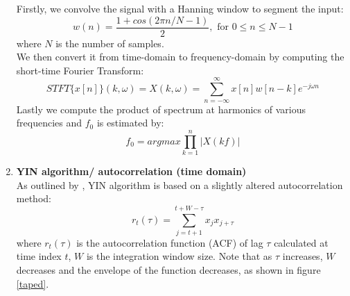 \begin{enumerate}
    Firstly, we convolve the signal with a Hanning window to segment the input:
    \[w(n) = \frac{1+cos(2\pi n/N-1)}{2}, \text{ for } 0 \leq n \leq N-1\] where $N$ is the number of samples.\\
    We then convert it from time-domain to frequency-domain by computing the short-time Fourier Transform:
    \[STFT \{x[n]\}(k,\omega) = X(k,\omega )= \sum _{n=-\infty }^{\infty }x[n]w[n-k]e^{-j\omega n}\]
    Lastly we compute the product of spectrum at harmonics of various frequencies and $f_0$ is estimated by:
    \[f_0 = argmax\prod_{k=1}^{n}|X(kf)|\] 

    \item \textbf{YIN algorithm/ autocorrelation (time domain)}\\
    As outlined by \cite{yin}, YIN algorithm is based on a slightly altered autocorrelation method:
    \[r_t(\tau)=\sum_{j=t+1}^{t+W-\tau}x_j x_{j+\tau}\]
    where $r_t(\tau)$ is the autocorrelation function (ACF) of lag $\tau$ calculated at time index $t$, $W$ is the integration
    window size. Note that as $\tau$ increases, $W$ decreases and the envelope of the function decreases, as shown in figure 
    \cref{taped}.


\end{enumerate}
